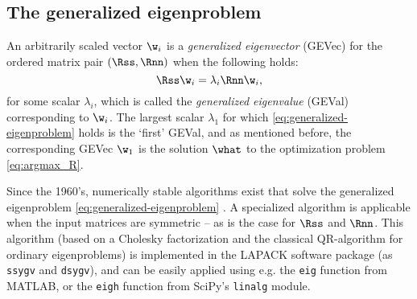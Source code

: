 \subsection{The generalized eigenproblem}
\label{sec:generalized-eigenproblem}

An arbitrarily scaled vector $\w_i$ is a \emph{generalized eigenvector} (GEVec) for the ordered matrix pair $(\Rss, \Rnn)$ when the following holds:
%
\begin{equation}
\label{eq:generalized-eigenproblem}
\Rss \w_i = \lambda_i \Rnn \w_i,
\end{equation}
%
for some scalar $\lambda_i$, which is called the \emph{generalized eigenvalue} (GEVal) corresponding to $\w_i$. The largest scalar $\lambda_1$ for which \cref{eq:generalized-eigenproblem} holds is the `first' GEVal, and as mentioned before, the corresponding GEVec $\w_1$ is the solution $\what$ to the optimization problem \cref{eq:argmax_R}.

Since the 1960's, numerically stable algorithms exist that solve the generalized eigenproblem \cref{eq:generalized-eigenproblem} \cite{Golub2013}. A specialized algorithm is applicable when the input matrices are symmetric -- as is the case for $\Rss$ and $\Rnn$. This algorithm (based on a Cholesky factorization and the classical QR-algorithm for ordinary eigenproblems) is implemented in the LAPACK software package (as \texttt{ssygv} and \texttt{dsygv}), and can be easily applied using e.g. the \texttt{eig} function from MATLAB, or the \texttt{eigh} function from SciPy's \texttt{linalg} module.
